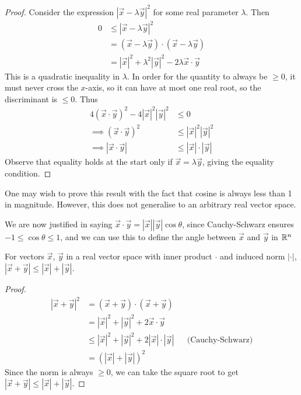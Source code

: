\documentclass{../../template/note}
\begin{document}
    \begin{proof}
        Consider the expression \(|\vec x - \lambda \vec y|^2\) for some real parameter \(\lambda\). Then
        \begin{align*}
            0 &\leq |\vec x - \lambda \vec y|^2 \\
            &= (\vec x - \lambda \vec y) \cdot (\vec x - \lambda \vec y) \\
            &= |\vec x|^2 + \lambda^2 |\vec y|^2 - 2 \lambda \vec x \cdot \vec y
        \end{align*}
        This is a quadratic inequality in \(\lambda\). In order for the quantity to always be \(\geq 0\), it must never cross the \(x\)-axis, so it can have at most one real root, so the discriminant is \(\leq 0\). Thus
        \begin{align*}
            4(\vec x \cdot \vec y)^2 - 4 |\vec x|^2 |\vec y|^2 &\leq 0 \\
            \implies (\vec x \cdot \vec y)^2 &\leq |\vec x|^2 |\vec y|^2 \\
            \implies |\vec x \cdot \vec y| &\leq |\vec x|\cdot|\vec y|
        \end{align*}
        Observe that equality holds at the start only if \(\vec x = \lambda \vec y\), giving the equality condition.
    \end{proof}
    
    \begin{remark}
        One may wish to prove this result with the fact that cosine is always less than 1 in magnitude. However, this does not generalise to an arbitrary real vector space.
    \end{remark}
    
    \begin{remark}
        We are now justified in saying \(\vec x \cdot \vec y = |\vec x||\vec y| \cos \theta\), since Cauchy-Schwarz ensures \(-1 \leq \cos \theta \leq 1\), and we can use this to define the angle between \(\vec x\) and \(\vec y\) in \(\mathbb R^n\)
    \end{remark}
    
    \begin{corollary}
        For vectors \(\vec x\), \(\vec y\) in a real vector space with inner product \(\cdot\) and induced norm \(|\cdot|\), \(|\vec x + \vec y| \leq |\vec x| + |\vec y|\).
    \end{corollary}
    
    \begin{proof}
        \begin{align*}
            |\vec x + \vec y|^2 &= (\vec x + \vec y) \cdot (\vec x + \vec y) \\
            &= |\vec x|^2 + |\vec y|^2 + 2 \vec x \cdot \vec y \\
            &\leq |\vec x|^2 + |\vec y|^2 + 2 |\vec x| \cdot |\vec y| && \text{(Cauchy-Schwarz)}\\
            &= (|\vec x| + |\vec y|)^2
        \end{align*}
        Since the norm is always \(\geq 0\), we can take the square root to get \(|\vec x + \vec y| \leq |\vec x| + |\vec y|\).
    \end{proof}
    
\end{document}
